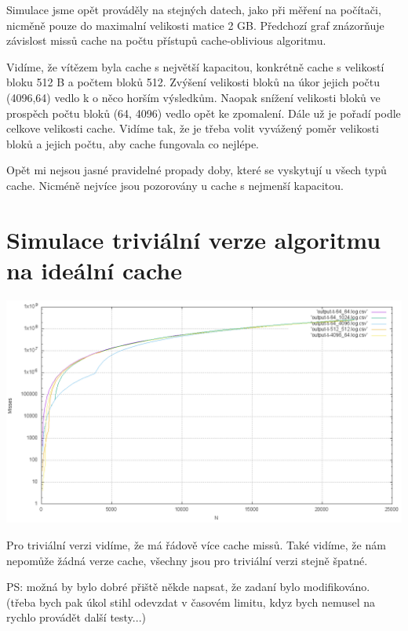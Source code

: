 \documentclass[12pt,a4paper]{report}
\begin{document}
Simulace jsme opět prováděly na stejných datech, jako při měření 
na počítači, nicměně pouze do maximalní velikosti matice 2 GB.
Předchozí graf znázorňuje závislost missů cache na počtu přístupů cache-oblivious algoritmu.

Vidíme, že vítězem byla cache s největší kapacitou, konkrétně cache s velikostí bloku 512 B
a počtem bloků 512. Zvýšení velikosti bloků na úkor jejich počtu (4096,64) vedlo k o něco horším výsledkům.
Naopak snížení velikosti bloků ve prospěch počtu bloků (64, 4096) vedlo opět ke zpomalení. 
Dále už je pořadí podle celkove velikosti cache. Vidíme tak, že je třeba volit vyvážený poměr
velikosti bloků a jejich počtu, aby cache fungovala co nejlépe.

Opět mi nejsou jasné pravidelné propady doby, které se vyskytují u všech typů cache. Nicméně
nejvíce jsou pozorovány u cache s nejmenší kapacitou.

\section{Simulace triviální verze algoritmu na ideální cache}
\includegraphics[width=\textwidth]{./tests/graph3.png}

Pro triviální verzi vidíme, že má řádově více cache missů. Také vidíme,
že nám nepomůže žádná verze cache, všechny jsou pro triviální verzi stejně špatné.



PS: možná by bylo dobré přiště někde napsat, že zadaní bylo modifikováno. 
(třeba bych pak úkol stihl odevzdat v časovém limitu, kdyz bych nemusel na rychlo provádět další testy...)
  
\end{document}
